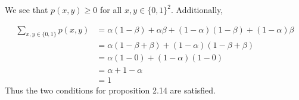 
We see that $ p(x,y) \geq 0$ for all $ x, y \in \{ 0,1 \} ^{2} $. Additionally,

\begin{align*}
    \sum_{x,y \in \{ 0,1 \} }^{} p(x,y) &= \alpha(1-\beta) + \alpha \beta + (1-\alpha)(1- \beta) +
    (1-\alpha)\beta\\
					&= \alpha(1 - \beta + \beta) + (1- \alpha)(1- \beta + \beta)
					\\
					&= \alpha(1-0) + (1-\alpha)(1-0)\\
					&= \alpha + 1 - \alpha \\
					&= 1
\end{align*}
Thus the two conditions for proposition 2.14 are satisfied.


